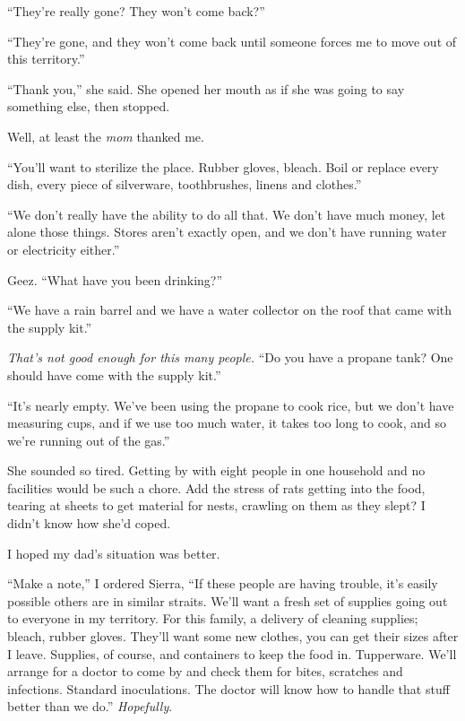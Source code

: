 ``They're really gone?  They won't come back?''



``They're gone, and they won't come back until someone forces me to move out of this territory.''



``Thank you,'' she said.  She opened her mouth as if she was going to say something else, then stopped.



Well, at least the \emph{mom} thanked me.



``You'll want to sterilize the place.  Rubber gloves, bleach.  Boil or replace every dish, every piece of silverware, toothbrushes, linens and clothes.''



``We don't really have the ability to do all that.  We don't have much money, let alone those things.  Stores aren't exactly open, and we don't have running water or electricity either.''



Geez.  ``What have you been drinking?''



``We have a rain barrel and we have a water collector on the roof that came with the supply kit.''



\emph{That's not good enough for this many people.}  ``Do you have a propane tank?  One should have come with the supply kit.''



``It's nearly empty.  We've been using the propane to cook rice, but we don't have measuring cups, and if we use too much water, it takes too long to cook, and so we're running out of the gas.''



She sounded so tired.  Getting by with eight people in one household and no facilities would be such a chore.  Add the stress of rats getting into the food, tearing at sheets to get material for nests, crawling on them as they slept?  I didn't know how she'd coped.



I hoped my dad's situation was better.



``Make a note,'' I ordered Sierra, ``If these people are having trouble, it's easily possible others are in similar straits.  We'll want a fresh set of supplies going out to everyone in my territory.  For this family, a delivery of cleaning supplies; bleach, rubber gloves.  They'll want some new clothes, you can get their sizes after I leave.  Supplies, of course, and containers to keep the food in.  Tupperware.  We'll arrange for a doctor to come by and check them for bites, scratches and infections.  Standard inoculations.  The doctor will know how to handle that stuff better than we do.''  \emph{Hopefully}.




